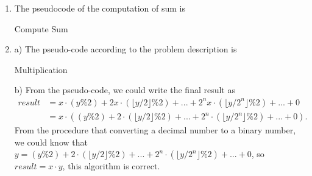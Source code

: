 \documentclass{assignment}
\begin{document}
    \begin{homeworkProblem}
    \begin{enumerate}
    \item The pseudocode of the computation of sum is  
     \begin{algorithm}[]
     \BlankLine
{}
\caption{Compute Sum} \end{algorithm}


\item  a) The pseudo-code according to the problem description is  
    \begin{algorithm}[h!]
    \BlankLine
{}
\caption{Multiplication} 
\end{algorithm}
\newpage
b) From the pseudo-code, we could write the final result as 
	\begin{equation*}
	\begin{aligned}
	result &= x\cdot (y \% 2) + 2x\cdot  (\lfloor y/2 \rfloor \% 2) + ... + 2^n x\cdot (\lfloor y/2^n \rfloor \% 2) + ... + 0 \\
	&= x \cdot \left( (y \% 2) + 2 \cdot (\lfloor y/2 \rfloor \% 2) + ... +  2^n \cdot (\lfloor y/2^n \rfloor \% 2) + ... + 0\right).
	\end{aligned}
	\end{equation*}
From the procedure that converting a decimal number to a binary number, we could know that $y = (y \% 2) + 2 \cdot (\lfloor y/2 \rfloor \% 2) + ... +  2^n \cdot (\lfloor y/2^n \rfloor \% 2) + ... + 0$, so $result = x \cdot y$, this algorithm is correct.


    \end{enumerate}
    \end{homeworkProblem}
    
\end{document}
